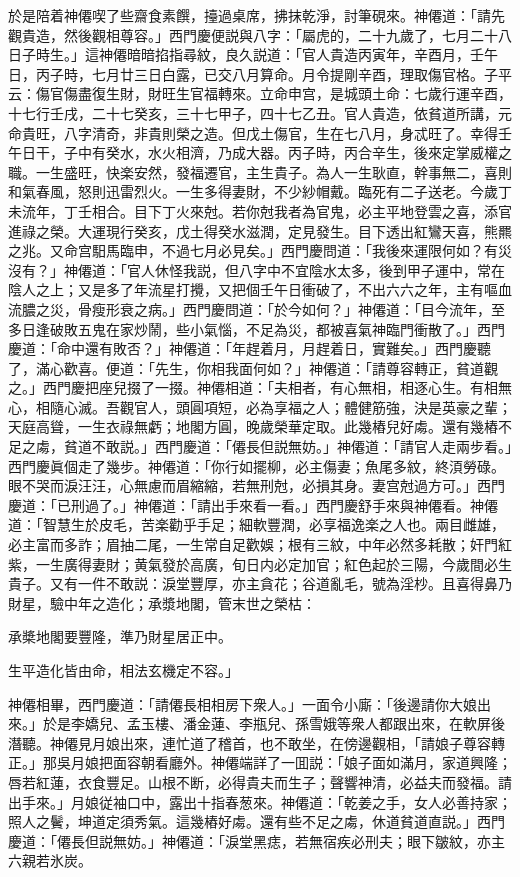 於是陪着神僊喫了些齋食素饌，擡過桌席，拂抹乾淨，討筆硯來。神僊道：「請先觀貴造，然後觀相尊容。」西門慶便説與八字：「屬虎的，二十九歲了，七月二十八日子時生。」這神僊暗暗掐指尋紋，良久説道：「官人貴造丙寅年，辛酉月，壬午日，丙子時，七月廿三日白露，已交八月算命。月令提剛辛酉，理取傷官格。子平云：傷官傷盡復生財，財旺生官福轉來。立命申宫，是城頭土命：七歲行運辛酉，十七行壬戌，二十七癸亥，三十七甲子，四十七乙丑。官人貴造，依貧道所講，元命貴旺，八字清奇，非貴則榮之造。但戊土傷官，生在七八月，身忒旺了。幸得壬午日干，子中有癸水，水火相濟，乃成大器。丙子時，丙合辛生，後來定掌威權之職。一生盛旺，快楽安然，發福遷官，主生貴子。為人一生耿直，幹事無二，喜則和氣春風，怒則迅雷烈火。一生多得妻財，不少紗帽戴。臨死有二子送老。今歲丁未流年，丁壬相合。目下丁火來尅。若你尅我者為官鬼，必主平地登雲之喜，添官進祿之榮。大運現行癸亥，戊土得癸水滋潤，定見發生。目下透出紅鸞天喜，熊羆之兆。又命宫馹馬臨申，不過七月必見矣。」西門慶問道：「我後來運限何如？有災沒有？」神僊道：「官人休怪我説，但八字中不宜陰水太多，後到甲子運中，常在陰人之上；又是多了年流星打攪，又把個壬午日衝破了，不出六六之年，主有嘔血流膿之災，骨瘦形衰之病。」西門慶問道：「於今如何？」神僊道：「目今流年，至多日逢破敗五鬼在家炒鬧，些小氣惱，不足為災，都被喜氣神臨門衝散了。」西門慶道：「命中還有敗否？」神僊道：「年趕着月，月趕着日，實難矣。」西門慶聽了，滿心歡喜。便道：「先生，你相我面何如？」神僊道：「請尊容轉正，貧道觀之。」西門慶把座兒掇了一掇。神僊相道：「夫相者，有心無相，相逐心生。有相無心，相隨心滅。吾觀官人，頭圓項短，必為享福之人；體健筋強，決是英豪之輩；天庭高聳，一生衣祿無虧；地閣方圓，晚歲榮華定取。此幾樁兒好䖏。還有幾樁不足之䖏，貧道不敢説。」西門慶道：「僊長但説無妨。」神僊道：「請官人走兩步看。」西門慶眞個走了幾步。神僊道：「你行如擺柳，必主傷妻；魚尾多紋，終湏勞碌。眼不哭而淚汪汪，心無慮而眉縮縮，若無刑尅，必損其身。妻宫尅過方可。」西門慶道：「已刑過了。」神僊道：「請出手來看一看。」西門慶舒手來與神僊看。神僊道：「智慧生於皮毛，苦楽勸乎手足；細軟豐潤，必享福逸楽之人也。兩目雌雄，必主富而多詐；眉抽二尾，一生常自足歡娛；根有三紋，中年必然多耗散；奸門紅紫，一生廣得妻財；黄氣發於高廣，旬日内必定加官；紅色起於三陽，今歲間必生貴子。又有一件不敢説：淚堂豐厚，亦主貪花；谷道亂毛，號為淫杪。且喜得鼻乃財星，驗中年之造化；承漿地閣，管末世之榮枯：

\begin{myquote}
承槳地閣要豐隆，準乃財星居正中。

生平造化皆由命，相法玄機定不容。」
\end{myquote}

神僊相畢，西門慶道：「請僊長相相房下衆人。」一面令小廝：「後邊請你大娘出來。」於是李嬌兒、孟玉樓、潘金蓮、李瓶兒、孫雪娥等衆人都跟出來，在軟屏後潛聽。神僊見月娘出來，連忙道了稽首，也不敢坐，在傍邊觀相，「請娘子尊容轉正。」那吳月娘把面容朝看廳外。神僊端詳了一囬説：「娘子面如滿月，家道興隆；唇若紅蓮，衣食豐足。山根不断，必得貴夫而生子；聲響神清，必益夫而發福。請出手來。」月娘従袖口中，露出十指春葱來。神僊道：「乾姜之手，女人必善持家；照人之鬢，坤道定須秀氣。這幾樁好䖏。還有些不足之䖏，休道貧道直説。」西門慶道：「僊長但説無妨。」神僊道：「淚堂黑痣，若無宿疾必刑夫；眼下皺紋，亦主六親若氷炭。

